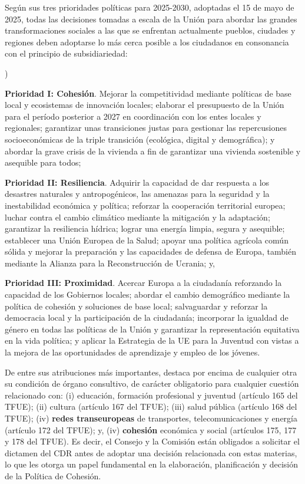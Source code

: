 \documentclass[10pt,a4paper]{article}
\newcounter{alphaitem}
\newenvironment{la}
      {\begin{list}{\alph{alphaitem})}{%
          \usecounter{alphaitem}%
          \setlength{\leftmargin}{1cm}%
          \setlength{\parskip}{3pt}%
          \setlength{\itemsep}{0pt}%
          \setlength{\parsep}{0pt}%
      }}
      {\end{list}}
\begin{document}
Según sus tres prioridades políticas para 2025-2030, adoptadas el 15 de mayo de 2025, todas las decisiones tomadas a escala de la Unión para abordar las grandes transformaciones sociales a las que se enfrentan actualmente pueblos, ciudades y regiones deben adoptarse lo más cerca posible a los ciudadanos en consonancia con el principio de subsidiariedad:
\begin{la}
    \item \textbf{Prioridad I: Cohesión}. Mejorar la competitividad mediante políticas de base local y ecosistemas de innovación locales; elaborar el presupuesto de la Unión para el período posterior a 2027 en coordinación con los entes locales y regionales; garantizar unas transiciones justas para gestionar las repercusiones socioeconómicas de la triple transición (ecológica, digital y demográfica); y abordar la grave crisis de la vivienda a fin de garantizar una vivienda sostenible y asequible para todos;
    \item \textbf{Prioridad II: Resiliencia}. Adquirir la capacidad de dar respuesta a los desastres naturales y antropogénicos, las amenazas para la seguridad y la inestabilidad económica y política; reforzar la cooperación territorial europea; luchar contra el cambio climático mediante la mitigación y la adaptación; garantizar la resiliencia hídrica; lograr una energía limpia, segura y asequible; establecer una Unión Europea de la Salud; apoyar una política agrícola común sólida y mejorar la preparación y las capacidades de defensa de Europa, también mediante la Alianza para la Reconstrucción de Ucrania; y,
    \item \textbf{Prioridad III: Proximidad}. Acercar Europa a la ciudadanía reforzando la capacidad de los Gobiernos locales; abordar el cambio demográfico mediante la política de cohesión y soluciones de base local; salvaguardar y reforzar la democracia local y la participación de la ciudadanía; incorporar la igualdad de género en todas las políticas de la Unión y garantizar la representación equitativa en la vida política; y aplicar la Estrategia de la UE para la Juventud con vistas a la mejora de las oportunidades de aprendizaje y empleo de los jóvenes.
\end{la}

De entre sus atribuciones más importantes, destaca por encima de cualquier otra su condición de órgano consultivo, de carácter obligatorio para cualquier cuestión relacionado con: (i) educación, formación profesional y juventud (artículo 165 del TFUE); (ii) cultura (artículo 167 del TFUE); (iii) salud pública (artículo 168 del TFUE); (iv) \textbf{redes transeuropeas} de transportes, telecomunicaciones y energía (artículo 172 del TFUE); y, (iv) \textbf{cohesión} económica y social (artículos 175, 177 y 178 del TFUE). Es decir, el Consejo y la Comisión están obligados a solicitar el dictamen del CDR antes de adoptar una decisión relacionada con estas materias, lo que les otorga un papel fundamental en la elaboración, planificación y decisión de la Política de Cohesión.
\end{document}
